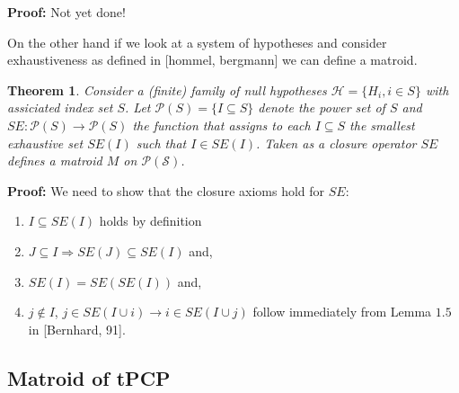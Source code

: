 \documentclass[a4paper,12pt]{article}
\newtheorem{theorem}{Theorem}
\newtheorem{comment}{Comment}
\newenvironment{proof}[1][Proof]{\noindent\textbf{#1:} }{}
\begin{document}
\begin{proof}
  Not yet done!
\end{proof}

\begin{comment}
  Above restriction (\ref{cond:matroid2}), already for the simple case
  of $|J|=1$, is no longer a statment about the parallels of
  $M$. 
\end{comment}



On the other hand if we look at a system of hypotheses and consider
exhaustiveness as defined in [hommel, bergmann] we can define a
matroid. 

\begin{theorem}
\label{the:matroid}
  Consider a (finite) family of null hypotheses $\mathcal{H} = \{H_i,
  i \in S\}$ with assiciated index set $S$. Let $\mathcal{P}(S) = \{I
  \subseteq S\}$ denote the power set of $S$ and $SE:\mathcal{P}(S)
  \rightarrow \mathcal{P}(S)$ the function that assigns to each $I
  \subseteq S$ the smallest exhaustive set $SE(I)$ such that $I \in
  SE(I)$. Taken as a closure operator $SE$ defines a matroid $M$ on
  $\mathcal{P(S)}$.
\end{theorem}

\begin{proof}
  We need to show that the closure axioms hold for $SE$:
  \begin{enumerate}
  \item $I \subseteq SE(I)$ holds by definition
  \item $J \subseteq I \Rightarrow SE(J) \subseteq SE(I)$ and,
  \item $SE(I) = SE(SE(I))$ and,
  \item $j \notin I$, $j \in SE(I \cup i) \rightarrow i \in SE(I \cup
    j)$ follow immediately from Lemma $1.5$ in [Bernhard, 91].
  \end{enumerate}
\end{proof}

\subsection{Matroid of tPCP}
\end{document}
